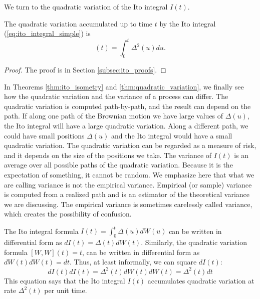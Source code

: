 \documentclass[\topdir/lecture\_notes.tex]{subfiles}
\begin{document}
We turn to the quadratic variation of the Ito integral $I(t)$.
\begin{theorem}\label{thm:quadratic_variation}
The quadratic variation accumulated up to time $t$ by the Ito integral (\ref{eq:ito_integral_simple}) is
\begin{equation}
[I, I](t)=\int_{0}^{t} \Delta^{2}(u) du. \label{eq:quadratic_variation_formula}
\end{equation}
\end{theorem}
\begin{proof} The proof is in Section \ref{subsec:ito_proofs}.\end{proof}

In Theorems \ref{thm:ito_isometry} and \ref{thm:quadratic_variation}, we finally see how the quadratic variation and the variance of a process can differ. The quadratic variation is computed path-by-path, and the result can depend on the path. If along one path of the Brownian motion we have large values of $\Delta(u)$, the Ito integral will have a large quadratic variation. Along a different path, we could have small positions $\Delta(u)$ and the Ito integral would have a small quadratic variation. The quadratic variation can be regarded as a measure of risk, and it depends on the size of the positions we take. The variance of $I(t)$ is an average over all possible paths of the quadratic variation. Because it is the expectation of something, it cannot be random. We emphasize here that what we are calling variance is not the empirical variance. Empirical (or sample) variance is computed from a realized path and is an estimator of the theoretical variance we are discussing. The empirical variance is sometimes carelessly called variance, which creates the possibility of confusion.

The Ito integral formula $I(t)=\int_{0}^{t} \Delta(u) dW(u)$ can be written in differential form as $dI(t)=\Delta(t) dW(t)$. Similarly, the quadratic variation formula $[W,W](t)=t$, can be written in differential form as $dW(t) dW(t)=dt$. Thus, at least informally, we can square $dI(t)$:
\begin{equation}
dI(t) dI(t)=\Delta^{2}(t) dW(t) dW(t)=\Delta^{2}(t) dt
\end{equation}
This equation says that the Ito integral $I(t)$ accumulates quadratic variation at rate $\Delta^{2}(t)$ per unit time. 
\end{document}
